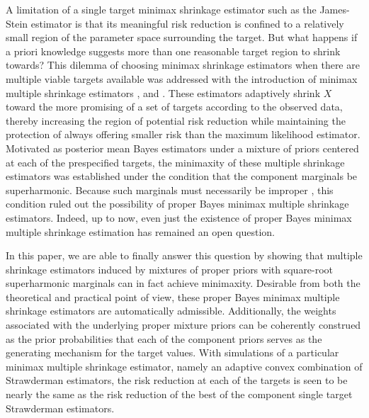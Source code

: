 \documentclass[11pt]{article}
\theoremstyle{definition}
\begin{document}
A limitation of a single target minimax shrinkage estimator such as the James-Stein estimator is that its meaningful risk reduction is confined to a relatively small region of the parameter space surrounding the target.  But what happens if a priori knowledge suggests  more than one reasonable target region to shrink towards? This dilemma of choosing  minimax shrinkage estimators when there are multiple viable targets available was addressed with the introduction of minimax multiple shrinkage estimators \cite{george1986a}, \cite{george1986c} and \cite{george1986b}. These estimators adaptively shrink $X$ toward the more promising of a set of targets according to the observed data, thereby increasing the region of potential risk reduction while maintaining the protection of always offering smaller risk than the maximum likelihood estimator.  Motivated as posterior mean Bayes estimators under a mixture of priors centered at each of the prespecified targets, the minimaxity of these multiple shrinkage estimators was established under the condition that the component marginals be superharmonic.  Because such marginals must necessarily be improper \cite{FSW1998}, this condition ruled out the possibility of proper Bayes  minimax multiple shrinkage estimators.  Indeed, up to now, even just the existence of proper Bayes minimax multiple shrinkage estimation has remained an open question.  

In this paper, we are able to finally answer this question by showing that multiple shrinkage estimators induced by mixtures of proper priors with square-root superharmonic marginals can in fact achieve minimaxity.  Desirable from both the theoretical and practical point of view, these proper Bayes minimax multiple shrinkage estimators are automatically admissible. Additionally, the weights associated with the underlying proper mixture priors can be coherently construed as the prior probabilities that each of the component priors serves as the generating mechanism for the target values.  With simulations of a particular minimax multiple shrinkage estimator, namely an adaptive convex combination of Strawderman estimators, the risk reduction at each of the targets is seen to be nearly the same as the risk reduction of the best of the component single target Strawderman estimators.  
\end{document}
